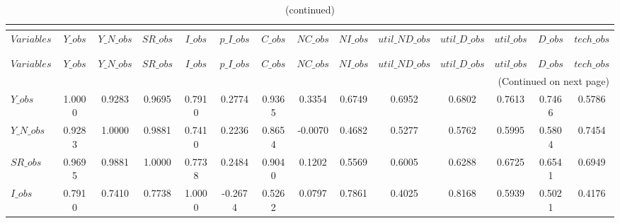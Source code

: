  
\begin{center}
\begin{longtable}{lccccccccccccc} 
\caption{MATRIX OF CORRELATIONS}\\
 \label{Table:th_corr_matrix}\\
\toprule 
$Variables      $	 & 	 $          Y\_obs$	 & 	 $      Y\_N\_obs$	 & 	 $         SR\_obs$	 & 	 $          I\_obs$	 & 	 $      p\_I\_obs$	 & 	 $          C\_obs$	 & 	 $         NC\_obs$	 & 	 $         NI\_obs$	 & 	 $  util\_ND\_obs$	 & 	 $   util\_D\_obs$	 & 	 $       util\_obs$	 & 	 $          D\_obs$	 & 	 $       tech\_obs$\\
\midrule \endfirsthead 
\caption{(continued)}\\
 \toprule \\ 
$Variables      $	 & 	 $          Y\_obs$	 & 	 $      Y\_N\_obs$	 & 	 $         SR\_obs$	 & 	 $          I\_obs$	 & 	 $      p\_I\_obs$	 & 	 $          C\_obs$	 & 	 $         NC\_obs$	 & 	 $         NI\_obs$	 & 	 $  util\_ND\_obs$	 & 	 $   util\_D\_obs$	 & 	 $       util\_obs$	 & 	 $          D\_obs$	 & 	 $       tech\_obs$\\
\midrule \endhead 
\midrule \multicolumn{14}{r}{(Continued on next page)} \\ \bottomrule \endfoot 
\bottomrule \endlastfoot 
$Y\_obs         $	 & 	           1.0000	 & 	           0.9283	 & 	           0.9695	 & 	           0.7910	 & 	           0.2774	 & 	           0.9365	 & 	           0.3354	 & 	           0.6749	 & 	           0.6952	 & 	           0.6802	 & 	           0.7613	 & 	           0.7466	 & 	           0.5786 \\ 
$Y\_N\_obs      $	 & 	           0.9283	 & 	           1.0000	 & 	           0.9881	 & 	           0.7410	 & 	           0.2236	 & 	           0.8654	 & 	          -0.0070	 & 	           0.4682	 & 	           0.5277	 & 	           0.5762	 & 	           0.5995	 & 	           0.5804	 & 	           0.7454 \\ 
$SR\_obs        $	 & 	           0.9695	 & 	           0.9881	 & 	           1.0000	 & 	           0.7738	 & 	           0.2484	 & 	           0.9040	 & 	           0.1202	 & 	           0.5569	 & 	           0.6005	 & 	           0.6288	 & 	           0.6725	 & 	           0.6541	 & 	           0.6949 \\ 
$I\_obs         $	 & 	           0.7910	 & 	           0.7410	 & 	           0.7738	 & 	           1.0000	 & 	          -0.2674	 & 	           0.5262	 & 	           0.0797	 & 	           0.7861	 & 	           0.4025	 & 	           0.8168	 & 	           0.5939	 & 	           0.5021	 & 	           0.4176 \\ 

\end{longtable}
\end{center}
